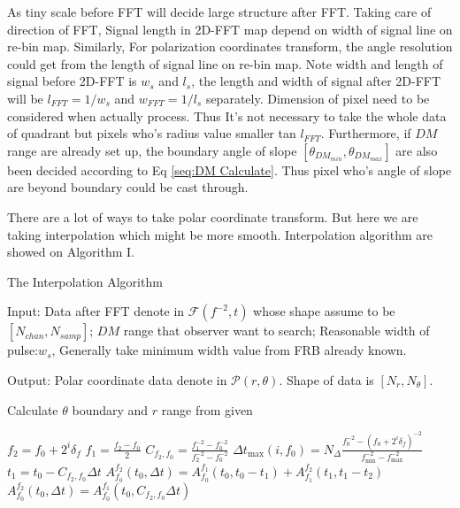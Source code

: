 \documentclass[twocolumn]{aastex61}
\begin{document}
As tiny scale before FFT will decide large structure after FFT. Taking care of direction of FFT, Signal length in 2D-FFT map depend on width of signal line on re-bin map. Similarly, For polarization coordinates transform, the angle resolution could get from the length of signal line on re-bin map.  Note width and length of signal before 2D-FFT is $w_s$ and $l_s$, the length and width of signal after 2D-FFT will be $l_{FFT}=1/w_s$ and $w_{FFT}=1/l_s$ separately. Dimension of pixel need to be considered when actually process.
Thus It's not necessary to take the whole data of quadrant \uppercase\expandafter{} but pixels who's radius value smaller tan $l_{FFT}$.  Furthermore, if $DM$ range are already set up, the boundary angle of slope $[\theta_{DM_{min}},\theta_{DM_{max}}]$ are also been decided according to Eq \ref{seq:DM Calculate}.  Thus pixel who's angle of slope are beyond boundary could be cast through.

There are a lot of ways to take polar coordinate transform. But here we are taking interpolation which might be more smooth. 
Interpolation algorithm are showed on Algorithm I.
\begin{algorithm}[H]
\caption{The Interpolation Algorithm}
\label{interpolation}
Input: Data after FFT denote in $\mathcal{F}(f^{-2},t)$ whose shape assume to be $[N_{chan}, N_{samp}]$; $DM$ range that observer want to search; Reasonable width of pulse:$w_s$, Generally take minimum width                                                 value from FRB already known. 

Output: Polar coordinate data denote in $\mathcal{P}(r,\theta)$. Shape of data is $[N_r,N_{\theta}]$.

\begin{algorithmic}
  \STATE Calculate $\theta$ boundary and $r$ range from given 
  
   
  \STATE $f_2 = f_0 + 2^i\delta_f$
  \STATE $f_1 = \frac{f_2 - f_0}{2}$
  \STATE $C_{f_2,f_0} = \frac{f_1^{-2} - f_0^{-2}}{f_2^{-2} - f_0^{-2}}$
  \STATE $\Delta t_{\max}(i,f_0) = N_\Delta \frac{f_0^{-2} - (f_0 + 2^i\delta_f)^{-2}} {f_{\min}^{-2} - f_{\max}^{-2}} $
  \STATE $t_1 = t_0 - C_{f_2,f_0}\Delta t$
  \STATE
  $
  A_{f_0}^{f_2}(t_0,\Delta t) = A_{f_0}^{f_1}(t_0,t_0-t_1) + A_{f_1}^{f_2}(t_1,t_1-t_2)
  $
  \ENDFOR
    \STATE
    $
    A_{f_0}^{f_2}(t_0,\Delta t) = A_{f_0}^{f_1}(t_0,C_{f_2,f_0} \Delta t)
    $
    \ENDFOR
    
  
  \ENDFOR
  \ENDFOR 
  \ENDFOR
  
\end{algorithmic}
\end{algorithm}
\end{document}
